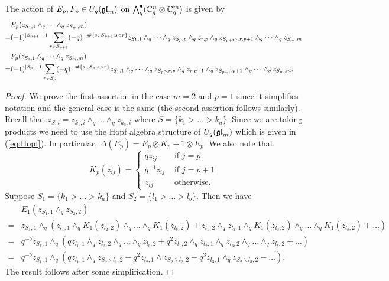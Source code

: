 \documentclass[11pt]{amsart}
\begin{document}
\begin{lem} \label{lem:Eaction}
The action of $E_p,F_p \in U_q({\mathfrak{gl}}_m)$ on ${\textstyle\bigwedge^{\bullet}_{q}} ({\mathbb{C}}_q^n \otimes {\mathbb{C}}_q^m)$ is given by
\begin{align*}
& E_p (z_{S_1,1} \wedge_q \cdots \wedge_q z_{S_m,m})  \\
=& (-1)^{|S_{p+1}|+1} \sum_{r \in S_{p+1}} (-q)^{- \# \{s \in S_{p+1}: s < r \}} z_{S_1,1} \wedge_q \cdots \wedge_q z_{S_p,p} \wedge_q z_{r,p} \wedge_q z_{S_{p+1} \smallsetminus r,p+1} \wedge_q \cdots \wedge_q z_{S_m,m} \notag \\
& F_p (z_{S_1,1} \wedge_q \cdots \wedge_q z_{S_m,m}) \\
=& (-1)^{|S_p|+1} \sum_{r \in S_p} (-q)^{- \#\{s \in S_p: s > r \}} z_{S_1,1} \wedge_q \cdots \wedge_q z_{S_p \smallsetminus r,p} \wedge_q z_{r,p+1} \wedge_q z_{S_{p+1},p+1} \wedge_q \cdots \wedge_q z_{S_m,m}. \notag
\end{align*}
\end{lem}
\begin{proof}
We prove the first assertion in the case $m=2$ and $p=1$ since it simplifies notation and the general case is the same (the second assertion follows similarly). Recall that $z_{S,i} = z_{k_1,i} \wedge_q \dots \wedge_q z_{k_a,i}$ where $S = \{k_1 > \dots > k_a\}$. Since we are taking products we need to use the Hopf algebra structure of $U_q({\mathfrak{gl}}_m)$ which is given in (\ref{eq:Hopf}). In particular, $\Delta(E_p) = E_p \otimes K_p + 1 \otimes E_p$. We also note that
$$K_p(z_{ij}) =
\begin{cases}
q z_{ij} & \text{ if } j=p \\
q^{-1} z_{ij} & \text{ if } j=p+1 \\
z_{ij} & \text{ otherwise.}
\end{cases}$$
Suppose $S_1 = \{k_1 > \dots > k_a\}$ and $S_2 = \{l_1 > \dots > l_b\}$. Then we have
\begin{align*}
& E_1(z_{S_1,1} \wedge_q z_{S_2,2}) \\
=& z_{S_1,1} \wedge_q ( z_{l_1,1} \wedge_q K_1(z_{l_2,2}) \wedge_q \dots \wedge_q K_1(z_{l_b,2}) + z_{l_1,2} \wedge_q z_{l_2,1} \wedge_q K_1(z_{l_3,2}) \wedge_q \dots \wedge_q K_1(z_{l_b,2}) + \dots ) \\
=& q^{-b} z_{S_1,1} \wedge_q ( q z_{l_1,1} \wedge_q z_{l_2,2} \wedge_q \dots \wedge_q z_{l_b,2} + q^2 z_{l_1,2} \wedge_q z_{l_2,1} \wedge_q z_{l_3,2} \wedge_q \dots \wedge_q z_{l_b,2} + \dots) \\
=& q^{-b} z_{S_1,1} \wedge_q (q z_{l_1,1} \wedge_q z_{S_2 \smallsetminus l_1,2} - q^2 z_{l_2,1} \wedge z_{S_2 \smallsetminus l_2,2} + q^3 z_{l_3,1} \wedge_q z_{S_2 \smallsetminus l_3,2} - \dots ).
\end{align*}
The result follows after some simplification.
\end{proof}
\end{document}
